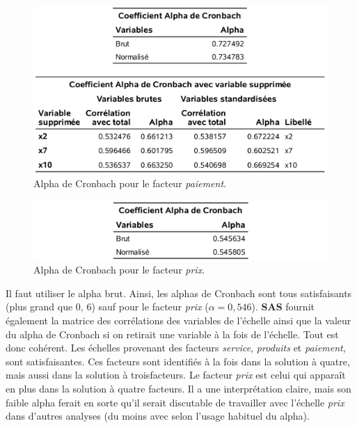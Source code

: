 \documentclass[
  11pt,
  letterpaper,
]{book}
\theoremstyle{definition}
\theoremstyle{definition}
\theoremstyle{definition}
\theoremstyle{definition}
\theoremstyle{remark}
\begin{document}
\begin{figure}

{\centering \includegraphics[width=0.85\linewidth]{figures/01-facto-e10} 

}

\caption{Alpha de Cronbach pour le facteur \emph{paiement}.}\label{fig:fig1p10}
\end{figure}

\begin{figure}

{\centering \includegraphics[width=0.85\linewidth]{figures/01-facto-e11} 

}

\caption{Alpha de Cronbach pour le facteur \emph{prix}.}\label{fig:fig1p11}
\end{figure}

Il faut utiliser le alpha brut. Ainsi, les alphas de Cronbach sont tous
satisfaisants (plus grand que 0, 6) sauf pour le facteur \emph{prix} (\(\alpha=0, 546\)). \textbf{SAS} fournit également la matrice des corrélations des variables de l'échelle ainsi que la valeur du alpha de Cronbach si on retirait une variable à la fois de l'échelle. Tout est donc cohérent. Les échelles provenant des facteurs \emph{service}, \emph{produits} et \emph{paiement}, sont satisfaisantes. Ces facteurs sont identifiés à la fois dans la solution à quatre, mais aussi dans la solution à troisfacteurs. Le facteur \emph{prix} est celui qui apparaît en plus dans la solution à quatre facteurs. Il a une interprétation claire, mais son faible alpha ferait en sorte qu'il serait discutable de travailler avec l'échelle \emph{prix} dans d'autres analyses (du moins avec selon l'usage habituel du alpha).
\end{document}

